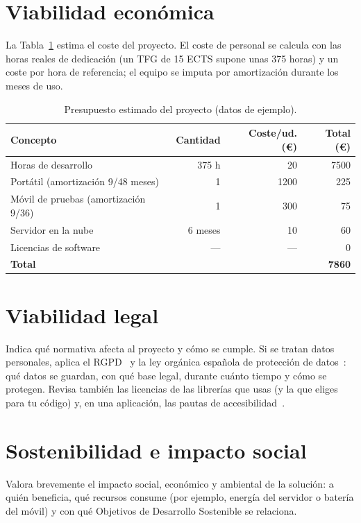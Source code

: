 
\section{Viabilidad económica}
\label{sec:viabilidad-economica}

La Tabla~\ref{tab:presupuesto} estima el coste del proyecto. El coste de
personal se calcula con las horas reales de dedicación (un \ac{TFG} de 15 ECTS
supone unas 375 horas) y un coste por hora de referencia; el equipo se imputa
por amortización durante los meses de uso.

\begin{table}[htbp]
  \centering
  \caption{Presupuesto estimado del proyecto (datos de ejemplo).}
  \label{tab:presupuesto}
  \begin{tabular}{@{}lrrr@{}}
    \toprule
    \textbf{Concepto} & \textbf{Cantidad} & \textbf{Coste/ud. (€)} & \textbf{Total (€)} \\
    \midrule
    Horas de desarrollo                    & 375 h    & 20          & \num{7500} \\
    Portátil (amortización 9/48 meses)     & 1        & \num{1200}  & 225 \\
    Móvil de pruebas (amortización 9/36)   & 1        & 300         & 75 \\
    Servidor en la nube                    & 6 meses  & 10          & 60 \\
    Licencias de software                  & ---      & ---         & 0 \\
    \midrule
    \textbf{Total}                         &          &             & \textbf{\num{7860}} \\
    \bottomrule
  \end{tabular}
\end{table}

\section{Viabilidad legal}
\label{sec:viabilidad-legal}

Indica qué normativa afecta al proyecto y cómo se cumple. Si se tratan datos
personales, aplica el \ac{RGPD}~\cite{rgpd2016} y la ley orgánica española de
protección de datos~\cite{lopdgdd2018}: qué datos se guardan, con qué base
legal, durante cuánto tiempo y cómo se protegen. Revisa también las licencias de
las librerías que usas (y la que eliges para tu código) y, en una aplicación,
las pautas de accesibilidad~\cite{wcag22}.

\section{Sostenibilidad e impacto social}
\label{sec:sostenibilidad}

Valora brevemente el impacto social, económico y ambiental de la solución: a
quién beneficia, qué recursos consume (por ejemplo, energía del servidor o
batería del móvil) y con qué Objetivos de Desarrollo Sostenible se relaciona.
